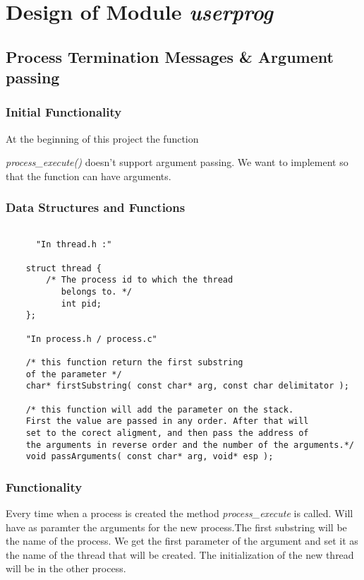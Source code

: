 \chapter{Design of Module \textit{userprog}}


\section{Process Termination Messages \& Argument passing}

    \subsection{Initial Functionality}

	At the beginning of this project the function 
{\textit{process\_execute()} doesn't support argument
passing. We want to implement so that the function can
have arguments.

    \subsection{Data Structures and Functions}

    \begin{lstlisting}

      "In thread.h :"
	
	struct thread {
	    /* The process id to which the thread
	       belongs to. */
	       int pid;
	};

	"In process.h / process.c"

	/* this function return the first substring 
	of the parameter */
	char* firstSubstring( const char* arg, const char delimitator );

	/* this function will add the parameter on the stack.
	First the value are passed in any order. After that will 
	set to the corect aligment, and then pass the address of
	the arguments in reverse order and the number of the arguments.*/
	void passArguments( const char* arg, void* esp );

    \end{lstlisting}


    \subsection{Functionality}

	  Every time when a process is created the method
    \textit{process\_execute} is called. Will have as paramter
    the arguments for the new process.The first substring will
    be the name of the process.
	  We get the first parameter of the argument and 
    set it as the name of the thread that will be created. The
    initialization of the new thread will be in the other process.

}
